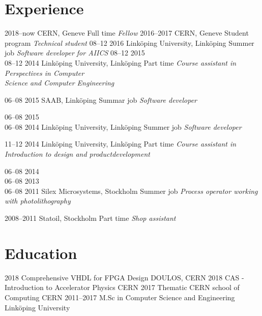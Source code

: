 \documentclass[]{cv-style}          %
\begin{document}
\parskip=1pt 
\section{Experience}

\begin{entrylist}
         \entry
    {2018–now}
    {CERN, Geneve}
    {Full time}
    {\emph{Fellow}}
         \entry
    {2016–2017}
    {CERN, Geneve}
    {Student program}
    {\emph{Technical student}}
         \entry
    {08–12 2016}
    {Linköping University, Linköping}
    {Summer job}
    {\emph{Software developer for AIICS}}
         \entry
    {08–12 2015\\08–12 2014}
    {Linköping University, Linköping}
    {Part time}
    {\emph{Course assistant in Perspectives in Computer\\ Science and Computer Engineering}}
  
  \entry
    {06–08 2015}
    {SAAB, Linköping}
    {Summar job}
    {\emph{Software developer}}
    
   \entry
    {06–08 2015\\06–08 2014 }
    {Linköping University, Linköping}
    {Summer job}
    {\emph{Software developer}}
   
       \entry
    {11–12 2014}
    {Linköping University, Linköping}
    {Part time}
    {\emph{Course assistant in Introduction to design and productdevelopment}}

    
  \entry
    {06–08 2014\\06–08 2013\\06–08 2011 }
    {Silex Microsystems, Stockholm}
    {Summer job}
    {\emph{Process operator working with photolithography}}
    
    
    
  \entry
    {2008–2011}
    {Statoil, Stockholm}
    {Part time}
    {\emph{Shop assistant}}

\end{entrylist}

\parskip=0pt 
\section{Education}

\begin{entrylist}
  \entry
    {2018}
    {Comprehensive VHDL for FPGA Design}
    {DOULOS, CERN}
    { }
  \entry
    {2018}
    {CAS - Introduction to Accelerator Physics}
    {CERN}
    { }
  \entry
    {2017}
    {Thematic CERN school of Computing}
    {CERN}
    { }
  \entry 
    {2011–2017}
    {M.Sc in Computer Science and Engineering}
    {Linköping University} 
    { }
\end{entrylist}
\end{document}

